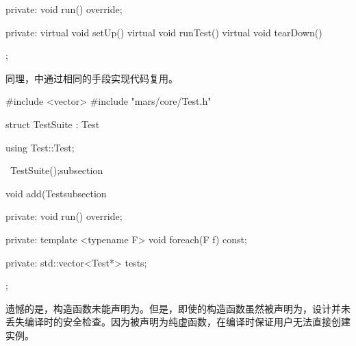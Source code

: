\begin{content}
\begin{leftbar}
\begin{c++}[caption={\ttfamily{include/mars/core/TestCase.h}}]
{private:
  void run() override;

private:
  virtual void setUp() {}
  virtual void runTest() {}
  virtual void tearDown() {}
};
 \end{c++}
\end{leftbar}

同理，中通过相同的手段实现代码复用。

\begin{leftbar}
 \begin{c++}[caption={\ttfamily{include/mars/core/TestSuite.h}}]
#include <vector>
#include "mars/core/Test.h"

struct TestSuite : Test {
  using Test::Test;

  ~TestSuite();subsection

  void add(Testsubsection

private:
  void run() override;

private:
  template <typename F>
  void foreach(F f) const;

private:
  std::vector<Test*> tests;
};
 \end{c++}
\end{leftbar}

遗憾的是，构造函数未能声明为。但是，即使的构造函数虽然被声明为，设计并未丢失编译时的安全检查。因为被声明为纯虚函数，在编译时保证用户无法直接创建实例。

\end{content}

